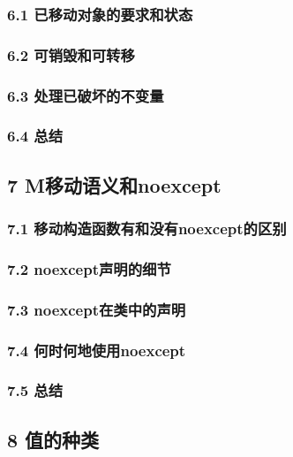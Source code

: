 \documentclass[11pt,a4paper,UTF8]{ctexart}
\begin{document}
		\subsubsection{6.1 已移动对象的要求和状态}
		
		\subsubsection{6.2 可销毁和可转移}
		
		\subsubsection{6.3 处理已破坏的不变量}
		
		\subsubsection{6.4 总结}
		
	\subsection{7 M移动语义和noexcept}
		\subsubsection{7.1 移动构造函数有和没有noexcept的区别}
		\subsubsection{7.2 noexcept声明的细节}
		\subsubsection{7.3 noexcept在类中的声明}
		\subsubsection{7.4 何时何地使用noexcept}
		\subsubsection{7.5 总结}
	\subsection{8 值的种类}
\end{document}
